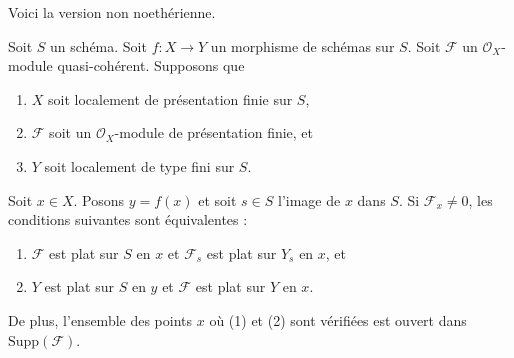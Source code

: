 \noindent
Voici la version non noethérienne.

\begin{theorem}
\label{theorem-criterion-flatness-fibre}
Soit $S$ un schéma.
Soit $f : X \to Y$ un morphisme de schémas sur $S$.
Soit $\mathcal{F}$ un $\mathcal{O}_X$-module quasi-cohérent.
Supposons que
\begin{enumerate}
\item $X$ soit localement de présentation finie sur $S$,
\item $\mathcal{F}$ soit un $\mathcal{O}_X$-module de présentation finie, et
\item $Y$ soit localement de type fini sur $S$.
\end{enumerate}
Soit $x \in X$. Posons $y = f(x)$ et soit $s \in S$ l'image de $x$ dans $S$.
Si $\mathcal{F}_x \not = 0$, les conditions suivantes sont équivalentes :
\begin{enumerate}
\item $\mathcal{F}$ est plat sur $S$ en $x$ et
$\mathcal{F}_s$ est plat sur $Y_s$ en $x$, et
\item $Y$ est plat sur $S$ en $y$ et $\mathcal{F}$ est
plat sur $Y$ en $x$.
\end{enumerate}
De plus, l'ensemble des points $x$ où (1) et (2) sont vérifiées est ouvert dans
$\text{Supp}(\mathcal{F})$.
\end{theorem}

